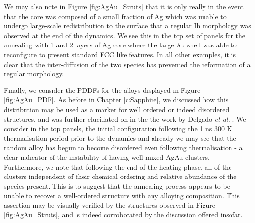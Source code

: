 We may also note in Figure \ref{fig:AgAu_Struts} that it is only really in the event that the core was composed of a small fraction of Ag which was unable to undergo large-scale redistribution to the surface that a regular Ih morphology was observed at the end of the dynamics. We see this in the top set of panels for the annealing with 1 and 2 layers of Ag core where the large Au shell was able to reconfigure to present standard FCC like features. In all other examples, it is clear that the inter-diffusion of the two species has prevented the reformation of a regular morphology.

Finally, we consider the PDDFs for the alloys displayed in Figure \ref{fig:AgAu_PDF}. As before in Chapter \ref{c:Sapphire}, we discussed how this distribution may be used as a marker for well ordered or indeed disordered structures, and was further elucidated on in the the work by Delgado \textit{et al.} \cite{LaiaMelt}. We consider in the top panels, the initial configuration following the 1 ns 300 K thermalisation period prior to the dynamics and already we may see that the random alloy has begun to become disordered even following thermalisation - a clear indicator of the instability of having well mixed AgAu clusters. Furthermore, we note that following the end of the heating phase, all of the clusters independent of their chemical ordering and relative abundance of the species present. This is to suggest that the annealing process appears to be unable to recover a well-ordered structure with any alloying composition. This assertion may be visually verified by the structures observed in Figure \ref{fig:AgAu_Struts}, and is indeed corroborated by the discussion offered insofar.


